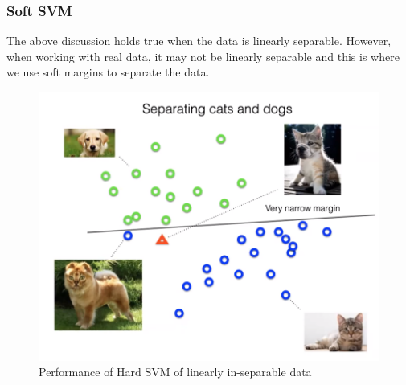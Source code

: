 \documentclass[11pt]{article}
\begin{document}







\subsubsection{Soft SVM}

The above discussion holds true when the data is linearly separable. However, when working with real data, it may not be linearly separable and this is where we use soft margins to separate the data. 

\begin{figure}[H]
\begin{center}
\includegraphics[scale=0.25]{figures/HardSVM.png}
\end{center}
\caption{Performance of Hard SVM of linearly in-separable data}
\label{fig:HardSVMPerf}
\end{figure}
\end{document}
